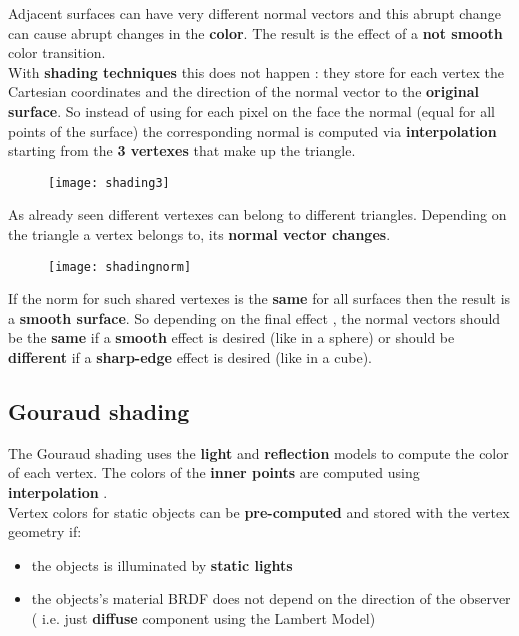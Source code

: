 Adjacent surfaces can have very different normal vectors and this abrupt change can cause abrupt changes in the \textbf{color}. The result is the effect of a \textbf{not smooth} color transition.\\
With \textbf{shading techniques} this does not happen : they store for each vertex the Cartesian coordinates and the direction of the normal vector to the \textbf{original surface}. So instead of using for each pixel on the face the normal (equal for all points of the surface) the corresponding normal is computed via \textbf{interpolation} starting from the \textbf{3 vertexes} that make up the triangle.
\begin{figure}[H]
  \centering
  \texttt{[image: shading3]}
\end{figure}
As already seen different vertexes can belong to different triangles. Depending on the triangle a vertex belongs to, its \textbf{normal vector changes}.
 \begin{figure}[H]
  \centering
  \texttt{[image: shadingnorm]}
\end{figure}
If the norm for such shared vertexes is the \textbf{same} for all surfaces then the result is a \textbf{smooth surface}. So depending on the final effect , the normal vectors should be the \textbf{same} if a \textbf{smooth} effect is desired (like in a sphere) or should be \textbf{different}  if a \textbf{sharp-edge} effect is desired (like in a cube).
\subsection{Gouraud shading}
The Gouraud shading uses the \textbf{light} and \textbf{reflection } models to compute the color of each vertex. The colors of the \textbf{inner points} are computed using \textbf{interpolation }.\\
Vertex colors for static objects can be \textbf{pre-computed} and stored with the vertex geometry if:
\begin{itemize}
\item the objects is illuminated by \textbf{static lights}
\item the objects's material BRDF does not depend on the direction of the observer ( i.e. just \textbf{diffuse} component using the Lambert Model)
\end{itemize}

